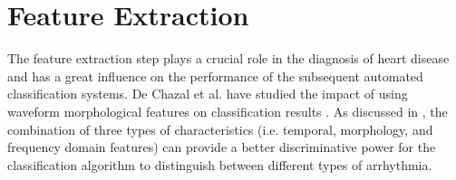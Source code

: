 
\section{Feature Extraction}

The feature extraction step plays a crucial role in the diagnosis of heart disease and has a great influence on the performance of the subsequent automated classification systems. De Chazal et al. have studied the impact of using waveform morphological features on classification results \cite{autofs}. As discussed in \cite{jambukia2015classification}, the combination of three types of characteristics (i.e. temporal, morphology, and frequency domain features) can provide a better discriminative power for the classification algorithm to distinguish between different types of arrhythmia. 

